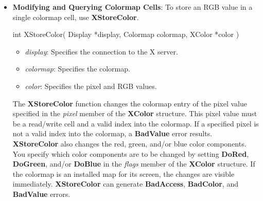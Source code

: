 \documentclass{report}
\begin{document}
\begin{itemize}
            \bigbreak \noindent
            All specified pixels that are allocated by the client in the colormap are freed, even if one or more pixels produce an error. If a specified pixel is not a valid index into the colormap, a \textbf{BadValue} error results. If a specified pixel is not allocated by the client, that is, if it is unallocated or is only allocated by another client, or if the colormap was created with all entries writable by passing \textbf{AllocAll} to \textbf{XCreateColormap}, a \textbf{BadAccess} error results. If more than one pixel is in error, the one that gets reported is arbitrary.
            \bigbreak \noindent
            \textbf{XFreeColors} can generate \textbf{BadAccess}, \textbf{BadColor}, and \textbf{BadValue} errors.
        \item \textbf{Modifying and Querying Colormap Cells}: To store an RGB value in a single colormap cell, use \textbf{XStoreColor}.
            \bigbreak \noindent
            \begin{cppcode}
                int XStoreColor(
                    Display *display,
                    Colormap colormap,
                    XColor *color
                )
            \end{cppcode}
            \bigbreak \noindent
            \begin{itemize}
                \item \textit{display}: Specifies the connection to the X server.
                \item \textit{colormap}: Specifies the colormap.
                \item \textit{color}: Specifies the pixel and RGB values.
            \end{itemize}
            \noindent
            The \textbf{XStoreColor} function changes the colormap entry of the pixel value specified in the \textit{pixel} member of the \textbf{XColor} structure. This pixel value must be a read/write cell and a valid index into the colormap. If a specified pixel is not a valid index into the colormap, a \textbf{BadValue} error results.
            \bigbreak \noindent
            \textbf{XStoreColor} also changes the red, green, and/or blue color components. You specify which color components are to be changed by setting \textbf{DoRed}, \textbf{DoGreen}, and/or \textbf{DoBlue} in the \textit{flags} member of the \textbf{XColor} structure. If the colormap is an installed map for its screen, the changes are visible immediately.
            \bigbreak \noindent
            \textbf{XStoreColor} can generate \textbf{BadAccess}, \textbf{BadColor}, and \textbf{BadValue} errors.

\end{itemize}
\end{document}
